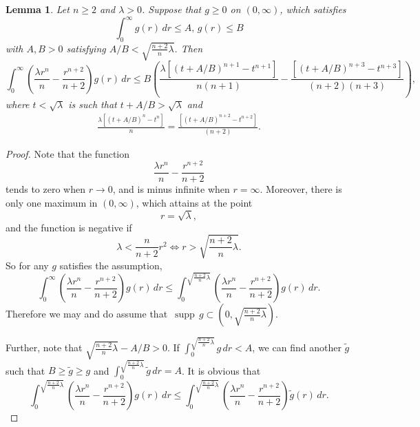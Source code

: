 \documentclass[11pt,twoside, leqno]{article}
\def\supp{{\mathop\mathrm{\,supp\,}}}
\newtheorem{lem}[thm]{Lemma}
\numberwithin{equation}{section}
\begin{document}
\begin{lem}\label{lem-3}
Let $n\ge 2$ and $\lambda>0$. Suppose that $g\ge 0$ on $(0,\infty)$, which satisfies
$$\int_0^\infty g(r)\,dr\le A,\, g(r)\le B$$
with $A,B>0$ satisfying $A/B<\sqrt{\frac{n+2}{n}\lambda}$.
Then
$$\int_0^\infty \left(\frac{\lambda r^n}{n} -\frac{r^{n+2}}{n+2}\right)g(r)\,dr\le B\left(\frac{\lambda \left[(t+A/B)^{n+1}-t^{n+1}\right]}{n(n+1)}-\frac{\left[(t+A/B)^{n+3}-t^{n+3}\right]}{(n+2)(n+3)}\right),$$
where  $t<\sqrt\lambda$  is such that $t+A/B>\sqrt{\lambda}$ and
\begin{align*}
\frac{\lambda \left[(t+A/B)^{n}-t^{n}\right]}{n}=\frac{\left[(t+A/B)^{n+2}-t^{n+2}\right]}{(n+2)}.
\end{align*}
\end{lem}
\begin{proof}
Note that the function
$$\frac{\lambda r^n}{n} -\frac{r^{n+2}}{n+2}$$
tends to zero when $r\to 0$, and is minus infinite when $r=\infty$.
Moreover, there is only one maximum in $(0,\infty)$, which attains at the point
$$r=\sqrt\lambda,$$
and the function is negative if
$$\lambda< \frac{n}{n+2}r^2\Longleftrightarrow r>\sqrt{\frac{n+2}{n}\lambda}.$$
So for any $g$ satisfies the assumption,
$$\int_0^\infty \left(\frac{\lambda r^n}{n} -\frac{r^{n+2}}{n+2}\right)g(r)\,dr\le \int_0^{\sqrt{\frac{n+2}{n}\lambda}} \left(\frac{\lambda r^n}{n} -\frac{r^{n+2}}{n+2}\right)g(r)\,dr.$$
Therefore we may and do assume that $\supp g\subset (0,\sqrt{\frac{n+2}{n}\lambda})$.

Further, note that $\sqrt{\frac{n+2}{n}\lambda}-A/B>0$.
If $\int_0^{\sqrt{\frac{n+2}{n}\lambda}}g\,dr<A$, we can find another $\tilde g$ such that
$B\ge \tilde g\ge g$ and $\int_0^{\sqrt{\frac{n+2}{n}\lambda}}\tilde g\,dr=A$. It is obvious that
$$\int_0^{\sqrt{\frac{n+2}{n}\lambda}} \left(\frac{\lambda r^n}{n} -\frac{r^{n+2}}{n+2}\right)g(r)\,dr\le \int_0^{\sqrt{\frac{n+2}{n}\lambda}} \left(\frac{\lambda r^n}{n} -\frac{r^{n+2}}{n+2}\right)\tilde g(r)\,dr.$$



\end{proof}
\end{document}
